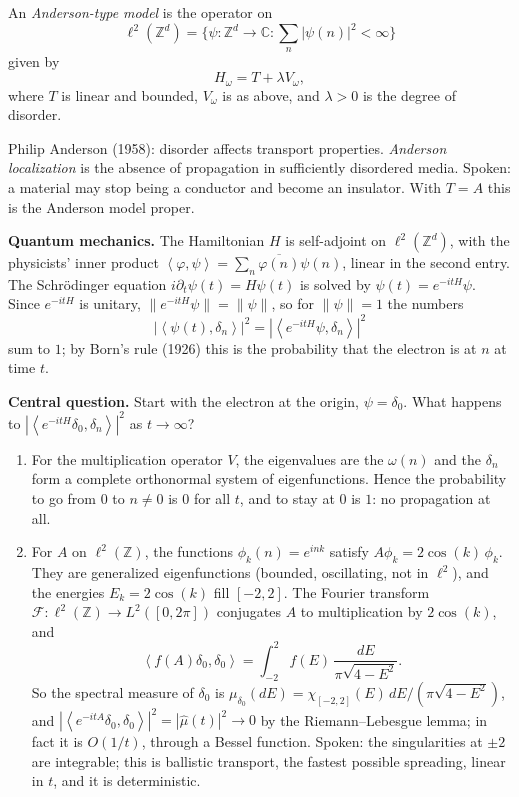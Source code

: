 \begin{definition}
\label{definition-anderson-type-model}
An \emph{Anderson-type model} is the
operator on
$$
\ell^2(\mathbb{Z}^d) = \Big\{\psi :
\mathbb{Z}^d \to \mathbb{C} :
\sum_{n} |\psi(n)|^2 < \infty\Big\}
$$
given by
$$
H_\omega = T + \lambda V_\omega,
$$
where $T$ is linear and bounded, $V_\omega$
is as above, and $\lambda > 0$ is the degree
of disorder.
\end{definition}

\noindent
Philip Anderson (1958): disorder affects
transport properties. \emph{Anderson
localization} is the absence of propagation
in sufficiently disordered media. Spoken: a
material may stop being a conductor and
become an insulator. With $T = A$ this is
the Anderson model proper.

\medskip\noindent
{\bf Quantum mechanics.} The Hamiltonian $H$
is self-adjoint on $\ell^2(\mathbb{Z}^d)$,
with the physicists' inner product
$\left\langle{} \varphi,\psi
\right\rangle{} = \sum_n
\overline{\varphi(n)}\psi(n)$, linear in the
second entry. The Schr\"odinger equation
$i\partial_t \psi(t) = H\psi(t)$ is solved by
$\psi(t) = e^{-itH}\psi$. Since $e^{-itH}$ is
unitary, $\|e^{-itH}\psi\| = \|\psi\|$, so
for $\|\psi\| = 1$ the numbers
$$
|\left\langle{} \psi(t),\delta_n
\right\rangle{}|^2
= |\left\langle{} e^{-itH}\psi,\delta_n
\right\rangle{}|^2
$$
sum to $1$; by Born's rule (1926) this is
the probability that the electron is at $n$
at time $t$.

\medskip\noindent
{\bf Central question.} Start with the
electron at the origin, $\psi = \delta_0$.
What happens to
$|\left\langle{} e^{-itH}\delta_0,\delta_n
\right\rangle{}|^2$ as $t \to \infty$?

\begin{enumerate}
\item For the multiplication operator $V$,
the eigenvalues are the $\omega(n)$ and the
$\delta_n$ form a complete orthonormal system
of eigenfunctions. Hence the probability to
go from $0$ to $n \neq 0$ is $0$ for all
$t$, and to stay at $0$ is $1$: no
propagation at all.
\item For $A$ on $\ell^2(\mathbb{Z})$, the
functions $\phi_k(n) = e^{ink}$ satisfy
$A\phi_k = 2\cos(k)\,\phi_k$. They are
generalized eigenfunctions (bounded,
oscillating, not in $\ell^2$), and the
energies $E_k = 2\cos(k)$ fill $[-2,2]$.
The Fourier transform
$\mathcal{F} : \ell^2(\mathbb{Z}) \to
L^2([0,2\pi])$ conjugates $A$ to
multiplication by $2\cos(k)$, and
$$
\left\langle{} f(A)\delta_0,\delta_0
\right\rangle{}
= \int_{-2}^{2} f(E)\,
\frac{dE}{\pi\sqrt{4-E^2}}.
$$
So the spectral measure of $\delta_0$ is
$\mu_{\delta_0}(dE) =
\chi_{[-2,2]}(E)\,dE/(\pi\sqrt{4-E^2})$, and
$|\left\langle{} e^{-itA}\delta_0,\delta_0
\right\rangle{}|^2 = |\hat\mu(t)|^2 \to 0$ by
the Riemann--Lebesgue lemma; in fact it is
$O(1/t)$, through a Bessel function. Spoken:
the singularities at $\pm 2$ are integrable;
this is ballistic transport, the fastest
possible spreading, linear in $t$, and it is
deterministic.
\end{enumerate}

